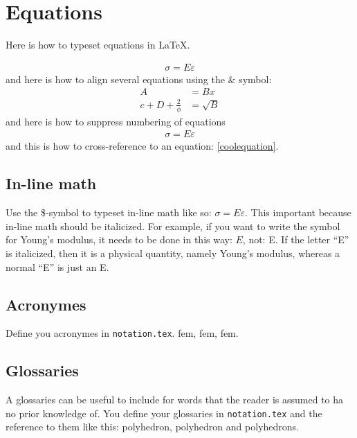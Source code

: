 \section{Equations}
Here is how to typeset equations in \LaTeX{}.

\begin{align}
\sigma = E\varepsilon \label{coolequation}
\end{align}
and here is how to align several equations using the \& symbol:
\begin{align}
A &= Bx \\ %
c + D +\frac{2}{\phi} &= \sqrt{B}
\end{align}
and here is how to suppress numbering of equations
\begin{align*}
\sigma = E\varepsilon
\end{align*}
and this is how to cross-reference to an equation: \cref{coolequation}.

\subsection{In-line math}
Use the \$-symbol to typeset in-line math like so: $\sigma = E\varepsilon$. This important because in-line math should be italicized. For example, if you want to write the symbol for Young's modulus, it needs to be done in this way: $E$, not: E. If the letter ``E'' is italicized, then it is a physical quantity, namely Young's modulus, whereas a normal ``E'' is just an E.

\subsection{Acronymes}
Define you acronymes in \texttt{notation.tex}. \acrlong{fem}, \acrshort{fem}, \acrfull{fem}.

\subsection{Glossaries}
A glossaries can be useful to include for words that the reader is assumed to ha no prior knowledge of. You define your glossaries in \texttt{notation.tex} and the reference to them like this: \Gls{polyhedron}, \gls{polyhedron} and \glspl{polyhedron}.